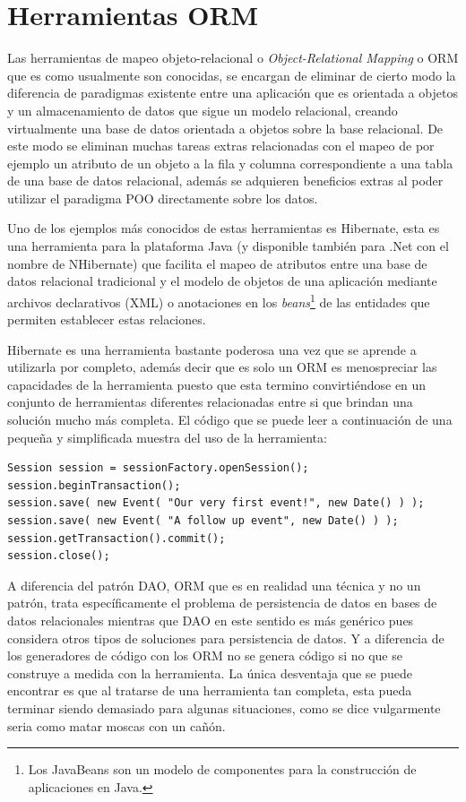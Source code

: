 \section{Herramientas ORM}
%
Las herramientas de mapeo objeto-relacional o \textit{Object-Relational Mapping} o ORM que es como usualmente son conocidas, se encargan de eliminar de cierto modo la diferencia de paradigmas existente entre una aplicación que es orientada a objetos y un almacenamiento de datos que sigue un modelo relacional, creando virtualmente una base de datos orientada a objetos sobre la base relacional. De este modo se eliminan muchas tareas extras relacionadas con el mapeo de por ejemplo un atributo de un objeto a la fila y columna correspondiente a una tabla de una base de datos relacional, además se adquieren beneficios extras al poder utilizar el paradigma POO directamente sobre los datos.

Uno de los ejemplos más conocidos de estas herramientas es Hibernate, esta es una herramienta para la plataforma Java (y disponible también para .Net con el nombre de NHibernate) que facilita el mapeo de atributos entre una base de datos relacional tradicional y el modelo de objetos de una aplicación mediante archivos declarativos (XML) o anotaciones en los \textit{beans}\footnote{Los JavaBeans son un modelo de componentes para la construcción de aplicaciones en Java.} de las entidades que permiten establecer estas relaciones. 

Hibernate es una herramienta bastante poderosa una vez que se aprende a utilizarla por completo, además decir que es solo un ORM es menospreciar las capacidades de la herramienta puesto que esta termino convirtiéndose en un conjunto de herramientas diferentes relacionadas entre si que brindan una solución mucho más completa. El código que se puede leer a continuación de una pequeña y simplificada muestra del uso de la herramienta:
\begin{lstlisting}[title=Minimo ejemplo de Hibernate: guardando datos en la DB]
Session session = sessionFactory.openSession();
session.beginTransaction();
session.save( new Event( "Our very first event!", new Date() ) );
session.save( new Event( "A follow up event", new Date() ) );
session.getTransaction().commit();
session.close();
\end{lstlisting}
A diferencia del patrón DAO, ORM que es en realidad una técnica y no un patrón, trata específicamente el problema de persistencia de datos en bases de datos relacionales mientras que DAO en este sentido es más genérico pues considera otros tipos de soluciones para persistencia de datos. Y a diferencia de los generadores de código con los ORM no se genera código si no que se construye a medida con la herramienta. La única desventaja que se puede encontrar es que al tratarse de una herramienta tan completa, esta pueda terminar siendo demasiado para algunas situaciones, como se dice vulgarmente seria como matar moscas con un cañón.
%
